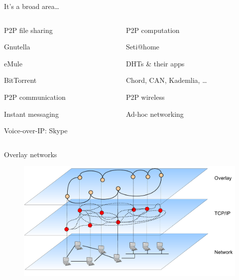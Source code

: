\begin{frame}{It's a broad area\ldots}

\begin{columns}
\begin{column}{0.5\textwidth}
\BIL
\item P2P file sharing
	\BI
	\item Gnutella
	\item eMule
	\item BitTorrent
	\EI
\item P2P communication
	\BI
	\item Instant messaging
	\item Voice-over-IP: Skype
	\EI
\EIL
\end{column}
\begin{column}{0.5\textwidth}
\BIL
\item P2P computation
	\BI
	\item Seti@home
	\EI
\item DHTs \& their apps
	\BI
	\item Chord, CAN, Kademlia, \ldots
	\EI
\item P2P wireless
	\BI
	\item Ad-hoc networking
	\EI
\EIL
\end{column}
\end{columns}

\end{frame}



\begin{frame}{Overlay networks}
\begin{figure}
	\includegraphics[width=\textwidth]{overlay}
\end{figure}
\end{frame}

